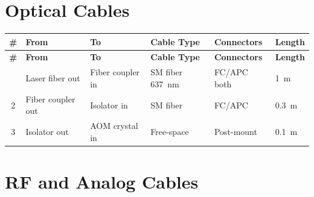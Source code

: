 \documentclass[11pt,a4paper,openany]{book}
\begin{document}
\section{Optical Cables}

\begin{center}
\small
\begin{longtable}{clp{2.2cm}p{2.2cm}ll}
\toprule
\textbf{\#} & \textbf{From} & \textbf{To} & \textbf{Cable Type} & \textbf{Connectors} & \textbf{Length} \\
\midrule
\endfirsthead
\toprule
\textbf{\#} & \textbf{From} & \textbf{To} & \textbf{Cable Type} & \textbf{Connectors} & \textbf{Length} \\
\midrule
\endhead
\bottomrule
\endfoot
\bottomrule
\endlastfoot
1 & Laser fiber out & Fiber coupler in & SM fiber 637~nm & FC/APC both & 1~m \\
2 & Fiber coupler out & Isolator in & SM fiber & FC/APC & 0.3~m \\
3 & Isolator out & AOM crystal in & Free-space & Post-mount & 0.1~m \\
\end{longtable}
\end{center}

\section{RF and Analog Cables}
\end{document}
